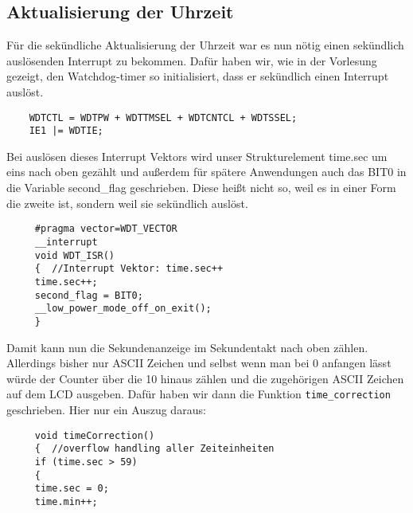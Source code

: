 \documentclass[openright,twoside,12pt,a4paper]{scrartcl}
\begin{document}
\begin{flushleft}
		\section{Aktualisierung der Uhrzeit}
		Für die sekündliche Aktualisierung der Uhrzeit war es nun nötig einen sekündlich auslösenden Interrupt zu bekommen. Dafür haben wir, wie in der Vorlesung gezeigt, den Watchdog-timer so initialisiert, dass er sekündlich einen Interrupt auslöst. 
		\begin{lstlisting}
	WDTCTL = WDTPW + WDTTMSEL + WDTCNTCL + WDTSSEL; 
	IE1 |= WDTIE; 
		\end{lstlisting}
		Bei auslösen dieses Interrupt Vektors wird unser Strukturelement time.sec um eins nach oben gezählt und außerdem für spätere Anwendungen auch das BIT0 in die Variable second\_flag geschrieben. Diese heißt nicht so, weil es in einer Form die zweite ist, sondern weil sie sekündlich auslöst.
		 \begin{lstlisting}
	 #pragma vector=WDT_VECTOR  
	 __interrupt
	 void WDT_ISR()  
	 {	//Interrupt Vektor: time.sec++
	 time.sec++;
	 second_flag = BIT0;
	 __low_power_mode_off_on_exit();
	 }
		 \end{lstlisting}
		 Damit kann nun die Sekundenanzeige im Sekundentakt nach oben zählen. Allerdings bisher nur ASCII Zeichen und selbst wenn man bei 0 anfangen lässt würde der Counter über die 10 hinaus zählen und die zugehörigen ASCII Zeichen auf dem LCD ausgeben. Dafür haben wir dann die Funktion \lstinline[language=c++]|time_correction| geschrieben. Hier nur ein Auszug daraus:
		 \begin{lstlisting}
	 void timeCorrection()    
	 {	//overflow handling aller Zeiteinheiten
	 if (time.sec > 59)
	 {
	 time.sec = 0;
	 time.min++;
	 

\end{lstlisting}
\end{flushleft}
\end{document}
